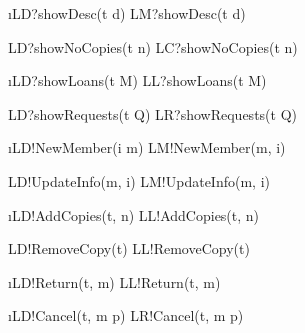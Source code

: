 \documentclass[12pt,a4paper]{article}
\begin{document}
\begin{showspecs}
	\begin{spec}{\i{LD?showDesc(t \to d)}}
		LM?showDesc(t \to d)
	\end{spec}

	\showbeside
	
	\begin{spec}{LD?showNoCopies(t \to n)}
		LC?showNoCopies(t \to n)
	\end{spec}

\end{showspecs}

\begin{showspecs}
	\begin{spec}{\i{LD?showLoans(t \to M)}}
		LL?showLoans(t \to M)
	\end{spec}

	\showbeside
	
	\begin{spec}{LD?showRequests(t \to Q)}
		LR?showRequests(t \to Q)
	\end{spec}

\end{showspecs}

\begin{showspecs}
	\begin{spec}{\i{LD!NewMember(i \to m)}}
		LM!NewMember(m, i)
	\end{spec}

	\showbeside
	
	\begin{spec}{LD!UpdateInfo(m, i)}
		LM!UpdateInfo(m, i)
	\end{spec}

\end{showspecs}

\begin{showspecs}
	\begin{spec}{\i{LD!AddCopies(t, n)}}
		LL!AddCopies(t, n)
	\end{spec}

	\showbeside
	
	\begin{spec}{LD!RemoveCopy(t)}
		LL!RemoveCopy(t)
	\end{spec}

\end{showspecs}


		
		
\begin{showspecs}
	\begin{spec}{\i{LD!Return(t, m)}}
		LL!Return(t, m)
	\end{spec}

	\showbeside

	\begin{spec}{\i{LD!Cancel(t, m \to p)}}
		LR!Cancel(t, m \to p)
	\end{spec}
\end{showspecs}			
		
\end{document}
